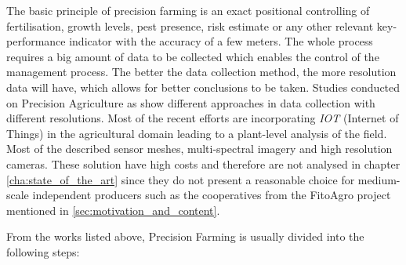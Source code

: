 The basic principle of precision farming is an exact positional controlling of fertilisation, growth levels, pest presence, risk estimate or any other relevant key-performance indicator with the accuracy of a few meters. The whole process requires a big amount of data to be collected which enables the control of the management process. The better the data collection method, the more resolution data will have, which allows for better conclusions to be taken. Studies conducted on Precision Agriculture as \cite{Khanal2017} \cite{Talavera2017} \cite{Kruize2016} \cite{Culibrina2015} \cite{Jawad2017} \cite{Resu2015} \cite{Alam2014} \cite{JointResearchCentreJRCoftheEuropeanCommission2014} \cite{Mohanraj2016} \cite{Sankaran2010} \cite{Nip2003} show different approaches in data collection with different resolutions. Most of the recent efforts are incorporating \emph{IOT} (Internet of Things) in the agricultural domain leading to a plant-level analysis of the field. Most of the described sensor meshes, multi-spectral imagery and high resolution cameras. These solution have high costs and therefore are not analysed in chapter \ref{cha:state_of_the_art} since they do not present a reasonable choice for medium-scale independent producers such as the cooperatives from the FitoAgro project mentioned in \ref{sec:motivation_and_content}.

From the works listed above, Precision Farming is usually divided into the following steps:

